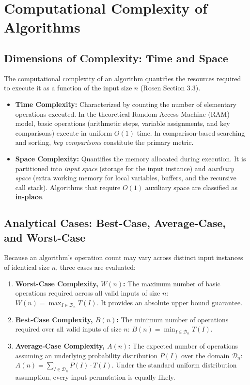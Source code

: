 \documentclass[10pt,a4paper]{article}
\theoremstyle{definition}
\begin{document}
\section{Computational Complexity of Algorithms}

\subsection{Dimensions of Complexity: Time and Space}
The computational complexity of an algorithm quantifies the resources required to execute it as a function of the input size $n$ (Rosen Section 3.3).
\begin{itemize}[leftmargin=*,itemsep=1pt,topsep=2pt]
    \item \textbf{Time Complexity:} Characterized by counting the number of elementary operations executed. In the theoretical Random Access Machine (RAM) model, basic operations (arithmetic steps, variable assignments, and key comparisons) execute in uniform $O(1)$ time. In comparison-based searching and sorting, \textit{key comparisons} constitute the primary metric.
    \item \textbf{Space Complexity:} Quantifies the memory allocated during execution. It is partitioned into \textit{input space} (storage for the input instance) and \textit{auxiliary space} (extra working memory for local variables, buffers, and the recursive call stack). Algorithms that require $O(1)$ auxiliary space are classified as \textbf{in-place}.
\end{itemize}

\subsection{Analytical Cases: Best-Case, Average-Case, and Worst-Case}
Because an algorithm's operation count may vary across distinct input instances of identical size $n$, three cases are evaluated:
\begin{enumerate}[leftmargin=*,itemsep=1pt,topsep=2pt]
    \item \textbf{Worst-Case Complexity, $W(n)$:} The maximum number of basic operations required across all valid inputs of size $n$: $W(n) = \max_{I \in \mathcal{D}_n} T(I)$. It provides an absolute upper bound guarantee.
    \item \textbf{Best-Case Complexity, $B(n)$:} The minimum number of operations required over all valid inputs of size $n$: $B(n) = \min_{I \in \mathcal{D}_n} T(I)$.
    \item \textbf{Average-Case Complexity, $A(n)$:} The expected number of operations assuming an underlying probability distribution $P(I)$ over the domain $\mathcal{D}_n$: $A(n) = \sum_{I \in \mathcal{D}_n} P(I) \cdot T(I)$. Under the standard uniform distribution assumption, every input permutation is equally likely.
\end{enumerate}
\end{document}
